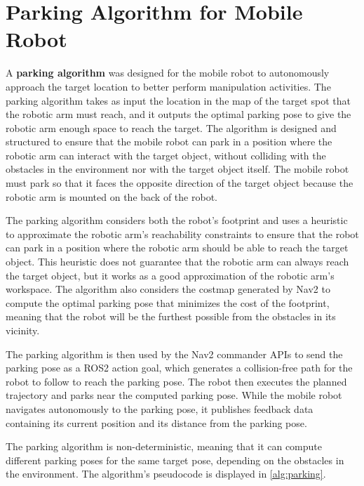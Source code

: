 \section{Parking Algorithm for Mobile Robot}
\label{sec:parking}

A \textbf{parking algorithm} was designed for the mobile robot to autonomously approach the target location
to better perform manipulation activities.
The parking algorithm takes as input the location in the map of the target spot that the robotic arm must reach,
and it outputs the optimal parking pose to give the robotic arm
enough space to reach the target. The algorithm is designed and structured to ensure that the mobile robot
can park in a position where the robotic arm can interact with the target object, without colliding with 
the obstacles in the environment nor with the target object itself. The mobile robot must park so that it 
faces the opposite direction of the target object because the robotic arm is mounted on the back of the robot.

The parking algorithm considers both the robot's footprint and uses a heuristic to approximate the robotic arm's
reachability constraints to ensure that the robot can park in a position where the robotic arm should be able 
to reach the target object. This heuristic does not guarantee that the robotic arm can always reach the target object,
but it works as a good approximation of the robotic arm's workspace.
The algorithm also considers the costmap generated by Nav2 to compute the optimal parking
pose that minimizes the cost of the footprint, meaning that the robot will be the furthest possible from
the obstacles in its vicinity. 

The parking algorithm is then used by the Nav2 commander APIs to send the parking pose as a ROS2 action goal,
which generates a collision-free path for the robot to follow to reach the parking pose. The robot then executes
the planned trajectory and parks near the computed parking pose. While the mobile robot navigates
autonomously to the parking pose, it publishes feedback data containing its current position and its distance 
from the parking pose. 

The parking algorithm is non-deterministic, meaning that it can compute different parking poses for the same target
pose, depending on the obstacles in the environment. The algorithm's pseudocode is displayed in \ref{alg:parking}.

